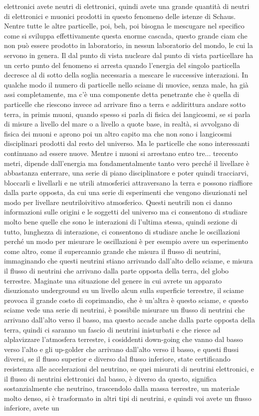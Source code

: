 elettronici avete neutri di elettronici, quindi avete una grande quantità di neutri di elettronici e muonici prodotti in questo fenomeno delle istenze di Schaus. Nentre tutte le altre particelle, poi, beh, poi bisogna le mescugare nel specifico come si sviluppa effettivamente questa enorme cascada, questo grande ciam che non può essere prodotto in laboratorio, in nessun laboratorio del mondo, le cui la servono in genera. Il dal punto di vista nucleare dal punto di vista particellare ha un certo punto del fenomeno si arresta quando l'energia del singolo particella decresce al di sotto della soglia necessaria a mescare le successive interazioni. In qualche modo il numero di particelle nello sciame di nuovice, senza male, ha già assi completamente, ma c'è una componente detta penetrante che è quella di particelle che riescono invece ad arrivare fino a terra e addirittura andare sotto terra, in primis muoni, quando spesso si parla di fisica dei langicosmi, se si parla di misure a livello del mare o a livello a quote base, in realtà, si avvolgano di fisica dei muoni e aprono poi un altro capito ma che non sono i langicosmi disciplinari prodotti dal resto del universo. Ma le particelle che sono interessanti continuano ad essere nuove. Mentre i muoni si arrestano entro tre... trecento metri, dipende dall'energia ma fondamentalmente tanto vero perché il livellare è abbastanza enterrare, una serie di piano disciplinatore e poter quindi tracciarvi, bloccarli e livellarli e ne utrili atmosferici attraversano la terra e possono riaffiore dalla parte opposta, da cui una serie di esperimenti che vengono disuzionati nel modo per livellare neutriloivitivo atmosferico. Questi neutrili non ci danno informazioni sulle origini e le soggetti del universo ma ci consentono di studiare molto bene quelle che sono le interazioni di l'ultima stessa, quindi sezione di tutto, lunghezza di interazione, ci consentono di studiare anche le oscillazioni perché un modo per misurare le oscillazioni è per esempio avere un esperimento come altro, come il supercannio grande che misura il flusso di neutrini, immaginando che questi neutrini stiano arrivando dall'alto dello sciame, e misura il flusso di neutrini che arrivano dalla parte opposta della terra, del globo terrestre. Maginate una situazione del genere in cui avrete un apparato disuzionato underground su un livello alcun sulla superficie terrestre, il sciame provoca il grande costo di coprimandio, che è un'altra è questo sciame, e questo sciame vede una serie di neutrini, è possibile misurare un flusso di neutrini che arrivano dall'alto verso il basso, ma questo accade anche dalla parte opposta della terra, quindi ci saranno un fascio di neutrini inisturbati e che riesce ad alplavizzare l'atmosfera terrestre, i cosiddenti down-going che vanno dal basso verso l'alto e gli up-golder che arrivano dall'alto verso il basso, e questi flussi diversi, se il flusso superior e diverso dal flusso inferiore, state certificando resistenza alle accelerazioni del neutrino, se quei misurati di neutrini elettronici, e il flusso di neutrini elettronici dal basso, è diverso da questo, significa sostanzialmente che neutrino, trascendolo dalla massa terrestre, un materiale molto denso, si è trasformato in altri tipi di neutrini, e quindi voi avete un flusso inferiore, avete un 